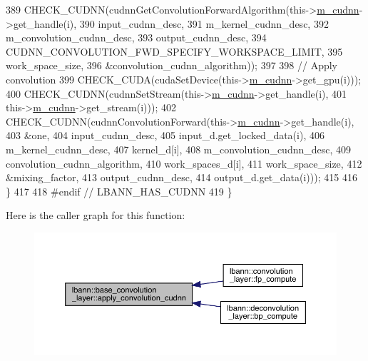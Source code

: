 \begin{DoxyCode}
389       CHECK\_CUDNN(cudnnGetConvolutionForwardAlgorithm(this->\hyperlink{classlbann_1_1Layer_a08dbb94239e3b8c96329786c57c72e21}{m\_cudnn}->get\_handle(i),
390                                                       input\_cudnn\_desc,
391                                                       m\_kernel\_cudnn\_desc,
392                                                       m\_convolution\_cudnn\_desc,
393                                                       output\_cudnn\_desc,
394                                                       CUDNN\_CONVOLUTION\_FWD\_SPECIFY\_WORKSPACE\_LIMIT,
395                                                       work\_space\_size,
396                                                       &convolution\_cudnn\_algorithm));
397 
398       \textcolor{comment}{// Apply convolution}
399       CHECK\_CUDA(cudaSetDevice(this->\hyperlink{classlbann_1_1Layer_a08dbb94239e3b8c96329786c57c72e21}{m\_cudnn}->get\_gpu(i)));
400       CHECK\_CUDNN(cudnnSetStream(this->\hyperlink{classlbann_1_1Layer_a08dbb94239e3b8c96329786c57c72e21}{m\_cudnn}->get\_handle(i),
401                                  this->\hyperlink{classlbann_1_1Layer_a08dbb94239e3b8c96329786c57c72e21}{m\_cudnn}->get\_stream(i)));
402       CHECK\_CUDNN(cudnnConvolutionForward(this->\hyperlink{classlbann_1_1Layer_a08dbb94239e3b8c96329786c57c72e21}{m\_cudnn}->get\_handle(i),
403                                           &one,
404                                           input\_cudnn\_desc,
405                                           input\_d.get\_locked\_data(i),
406                                           m\_kernel\_cudnn\_desc,
407                                           kernel\_d[i],
408                                           m\_convolution\_cudnn\_desc,
409                                           convolution\_cudnn\_algorithm,
410                                           work\_spaces\_d[i],
411                                           work\_space\_size,
412                                           &mixing\_factor,
413                                           output\_cudnn\_desc,
414                                           output\_d.get\_data(i)));
415 
416     \}
417 
418 \textcolor{preprocessor}{  #endif // LBANN\_HAS\_CUDNN}
419   \}
\end{DoxyCode}
Here is the caller graph for this function\+:\nopagebreak
\begin{figure}[H]
\begin{center}
\leavevmode
\includegraphics[width=350pt]{classlbann_1_1base__convolution__layer_a1c6e967ab0c66cfa0d27f7abfbbf2be8_icgraph}
\end{center}
\end{figure}
